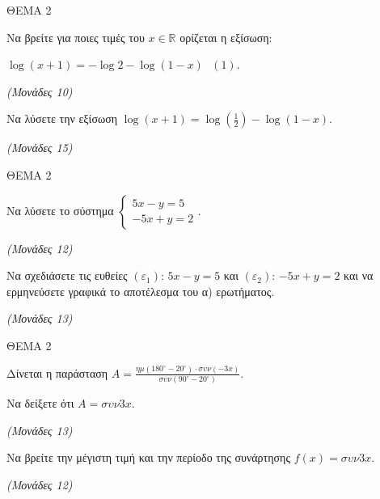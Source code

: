 \documentclass[11pt,a4paper,twoside]{book}
\newcommand{\monades}[1]{\hfill \textit{(Μονάδες #1)}}
\begin{document}
\vspace{4mm}

ΘΕΜΑ 2

\begin{alist}
\item Να βρείτε για ποιες τιμές του $x \in {\mathbb{R}}$ ορίζεται η εξίσωση:

$\log(x + 1) = - \log 2 - \log(1 - x)\text{  }(1).$

\monades{10}

\item Να λύσετε την εξίσωση $\log(x + 1) = \log\left( \frac{1}{2} \right) - \log(1 - x).$

\monades{15}
\end{alist}

\vspace{4mm}

ΘΕΜΑ 2

\begin{alist}
\item Να λύσετε το σύστημα $\begin{cases} 5x - y = 5 \\ -5x + y = 2 \end{cases}$.

\monades{12}

\item Να σχεδιάσετε τις ευθείες $(\varepsilon_1)$: $5x - y = 5$ και $(\varepsilon_2)$: $-5x + y = 2$ και να ερμηνεύσετε γραφικά το αποτέλεσμα του α) ερωτήματος.

\monades{13}
\end{alist}

\vspace{4mm}

ΘΕΜΑ 2

Δίνεται η παράσταση $A = \frac{\eta\mu(180^{\circ} - 20^{\circ}) \cdot \sigma\upsilon\nu(-3x)}{\sigma\upsilon\nu(90^{\circ} - 20^{\circ})}$.

\begin{alist}
\item Να δείξετε ότι $A = \sigma\upsilon\nu 3x$.

\monades{13}

\item Να βρείτε την μέγιστη τιμή και την περίοδο της συνάρτησης $f(x) = \sigma\upsilon\nu 3x$.

\monades{12}
\end{alist}
\end{document}
